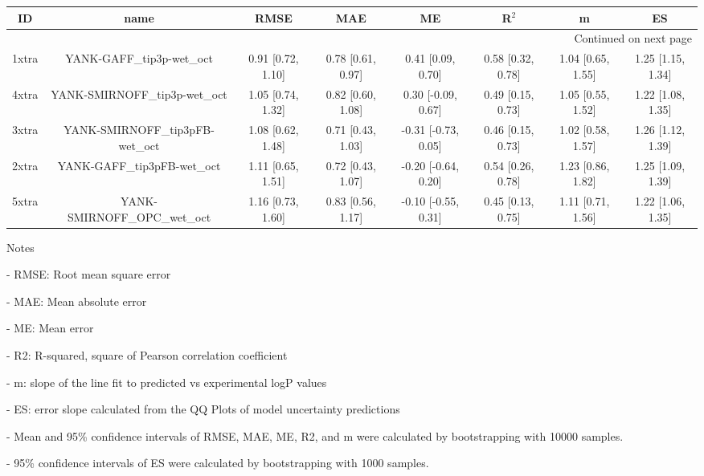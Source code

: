 \documentclass{article}
\begin{document}
\begin{center}
\begin{longtable}{|cccccccc|}
\toprule
    ID &                             name &               RMSE &                MAE &                   ME &              R$^2$ &                  m &                 ES \\
\midrule
\endhead
\midrule
\multicolumn{8}{r}{{Continued on next page}} \\
\midrule
\endfoot

\bottomrule
\endlastfoot
 1xtra &        YANK-GAFF\_tip3p-wet\_oct &  0.91 [0.72, 1.10] &  0.78 [0.61, 0.97] &    0.41 [0.09, 0.70] &  0.58 [0.32, 0.78] &  1.04 [0.65, 1.55] &  1.25 [1.15, 1.34] \\
 4xtra &    YANK-SMIRNOFF\_tip3p-wet\_oct &  1.05 [0.74, 1.32] &  0.82 [0.60, 1.08] &   0.30 [-0.09, 0.67] &  0.49 [0.15, 0.73] &  1.05 [0.55, 1.52] &  1.22 [1.08, 1.35] \\
 3xtra &  YANK-SMIRNOFF\_tip3pFB-wet\_oct &  1.08 [0.62, 1.48] &  0.71 [0.43, 1.03] &  -0.31 [-0.73, 0.05] &  0.46 [0.15, 0.73] &  1.02 [0.58, 1.57] &  1.26 [1.12, 1.39] \\
 2xtra &      YANK-GAFF\_tip3pFB-wet\_oct &  1.11 [0.65, 1.51] &  0.72 [0.43, 1.07] &  -0.20 [-0.64, 0.20] &  0.54 [0.26, 0.78] &  1.23 [0.86, 1.82] &  1.25 [1.09, 1.39] \\
 5xtra &     YANK-SMIRNOFF\_OPC\_wet\_oct &  1.16 [0.73, 1.60] &  0.83 [0.56, 1.17] &  -0.10 [-0.55, 0.31] &  0.45 [0.13, 0.75] &  1.11 [0.71, 1.56] &  1.22 [1.06, 1.35] \\
\end{longtable}
\end{center}

Notes

- RMSE: Root mean square error

- MAE: Mean absolute error

- ME: Mean error

- R2: R-squared, square of Pearson correlation coefficient

- m: slope of the line fit to predicted vs experimental logP values

- ES: error slope calculated from the QQ Plots of model uncertainty predictions

- Mean and 95\% confidence intervals of RMSE, MAE, ME, R2, and m were calculated by bootstrapping with 10000 samples.

- 95\% confidence intervals of ES were calculated by bootstrapping with 1000 samples.\end{document}
\end{document}
